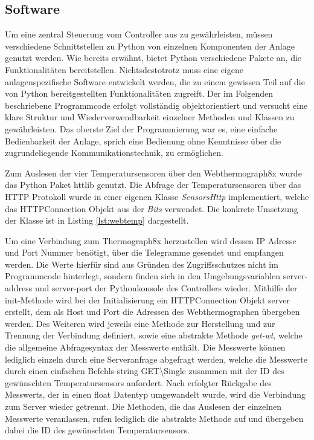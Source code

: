 \subsection{Software}

Um eine zentral Steuerung vom Controller aus zu gewährleisten, müssen verschiedene Schnittstellen zu Python von einzelnen Komponenten der Anlage genutzt werden.
Wie bereits erwähnt, bietet Python verschiedene Pakete an, die Funktionalitäten bereitstellen. Nichtsdestotrotz muss eine eigene anlagenspezifische Software entwickelt werden, die zu einem gewissen Teil auf die von Python bereitgestellten Funktionalitäten zugreift. Der im Folgenden beschriebene Programmcode erfolgt vollständig objektorientiert und versucht eine klare Struktur und Wiederverwendbarkeit einzelner Methoden und Klassen zu gewährleisten. Das oberste Ziel der Programmierung war es, eine einfache Bedienbarkeit der Anlage, sprich eine Bedienung ohne Kenntnisse über die zugrundeliegende Kommunikationstechnik, zu ermöglichen.

Zum Auslesen der vier Temperatursensoren über den Webthermograph8x wurde das Python Paket httlib genutzt. Die Abfrage der Temperatursensoren über das HTTP Protokoll wurde in einer eigenen Klasse \textit{SensorsHttp} implementiert, welche das HTTPConnection Objekt aus der \textit{Bits} verwendet. Die konkrete Umsetzung der Klasse ist in Listing \ref{lst:webtemp} dargestellt.

Um eine Verbindung zum Thermograph8x herzustellen wird dessen IP Adresse und Port Nummer benötigt, über die Telegramme gesendet und empfangen werden. Die Werte hierfür sind aus Gründen des Zugriffsschutzes nicht im Programmcode hinterlegt, sondern finden sich in den Umgebungsvariablen server-address und server-port der Pythonkonsole des Controllers wieder.
Mithilfe der init-Methode wird bei der Initialisierung ein HTTPConnection Objekt server erstellt, dem als Host und Port die Adressen des Webthermographen übergeben werden.
Des Weiteren wird jeweils eine Methode zur Herstellung und zur Trennung der Verbindung definiert, sowie eine abstrakte Methode \textit{get-wt}, welche die allgemeine Abfragesyntax der Messwerte enthält. Die Messwerte können lediglich einzeln durch eine Serveranfrage abgefragt werden, welche die Messwerte durch einen einfachen Befehls-string \Gun GET\textbackslash Single \Gob zusammen mit der ID des gewünschten Temperatursensors anfordert. Nach erfolgter Rückgabe des Messwerts, der in einen float Datentyp umgewandelt wurde, wird die Verbindung zum Server wieder getrennt. Die Methoden, die das Auslesen der einzelnen Messwerte veranlassen, rufen lediglich die abstrakte Methode auf und übergeben dabei die ID des gewünschten Temperatursensors.

